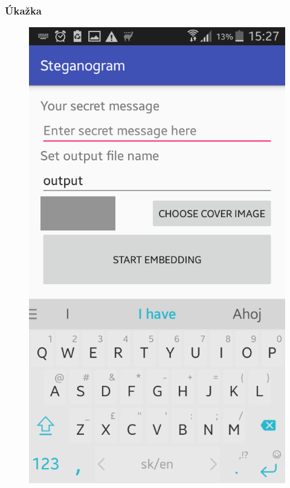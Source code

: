 \documentclass{beamer}
\begin{document}
\begin{frame}
    \frametitle{Úkažka}
    \begin{figure}
    \centerline{\includegraphics[height=0.8 \textheight]{images/screen_2.png}}
    
    \end{figure}
\end{frame}
\end{document}
